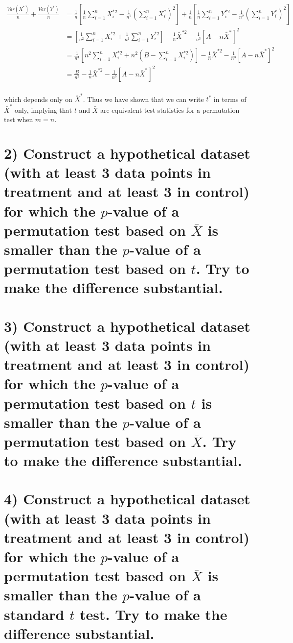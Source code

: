 \documentclass[11pt]{article}
\begin{document}
\begin{align*}
\frac{Var(X^*)}{n} + \frac{Var(Y^*)}{n} &= \frac{1}{n} \left[ \frac1n \sum_{i=1}^n X_i^{*2} - \frac{1}{n^2} \left( \sum_{i=1}^n X_i^*\right)^2 \right] + \frac{1}{n} \left[ \frac1n \sum_{i=1}^n Y_i^{*2} - \frac{1}{n^2} \left( \sum_{i=1}^n Y_i^*\right)^2 \right]\\
& = \left[ \frac{1}{n^2} \sum_{i=1}^n X_i^{*2} + \frac{1}{n^2} \sum_{i=1}^n Y_i^{*2} \right] - \frac1n\bar{X}^{*2} - \frac{1}{n^3} \left[A - n \bar{X}^* \right]^2\\
& = \frac{1}{n^4}\left[ n^2 \sum_{i=1}^n X_i^{*2} + n^2\left(B - \sum_{i=1}^n X_i^{*2}\right) \right] - \frac1n\bar{X}^{*2} - \frac{1}{n^3} \left[A - n \bar{X}^* \right]^2\\
& = \frac{B}{n^2} - \frac1n\bar{X}^{*2} - \frac{1}{n^3} \left[A - n \bar{X}^* \right]^2\\
\end{align*}

\noindent which depends only on $\bar{X}^{*}$. Thus we have shown that we can write $t^*$ in terms of $\bar{X}^*$ only, implying that $t$ and $\bar{X}$ are equivalent test statistics for a permutation test when $m  = n$.


\section*{2) Construct a hypothetical dataset (with at least 3 data points in treatment and at least 3 in control) for which the $p$-value of a permutation test based on $\bar{X}$ is smaller than the $p$-value of a permutation test based on $t$. Try to make the difference substantial.}


\section*{3) Construct a hypothetical dataset (with at least 3 data points in treatment and at least 3 in control) for which the $p$-value of a permutation test based on $t$ is smaller than the $p$-value of a permutation test based on $\bar{X}$. Try to make the difference substantial.}

\section*{4) Construct a hypothetical dataset (with at least 3 data points in treatment and at least 3 in control) for which the $p$-value of a permutation test based on $\bar{X}$ is smaller than the $p$-value of a standard $t$ test. Try to make the difference substantial.}
\end{document}
